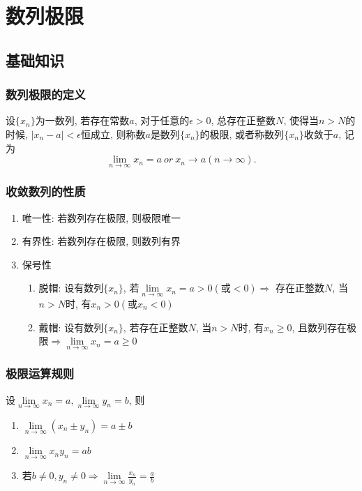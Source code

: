 \chapter{数列极限}
\section{基础知识}
\subsection{数列极限的定义}
设$ \{x_{n}\} $为一数列, 若存在常数$ a $, 对于任意的$ \epsilon >0 $, 总存在正整数$ N $, 使得当$ n>N $的时候, $ |x_{n}-a|<\epsilon $恒成立, 则称数$ a $是数列$ \{x_{n}\} $的极限, 或者称数列$ \{x_{n}\} $收敛于$ a $, 记为
\begin{equation*}
\lim_{n\rightarrow \infty} x_{n} = a\ or\ x_{n}\rightarrow a(n\rightarrow \infty).
\end{equation*}
\subsection{收敛数列的性质}
\begin{enumerate}
\item 唯一性: 若数列存在极限, 则极限唯一
\item 有界性: 若数列存在极限, 则数列有界
\item 保号性
\begin{enumerate}
\item 脱帽: 设有数列$ \{x_{n}\} $, 若$ \lim\limits_{n\rightarrow \infty}x_{n}=a>0(\text{或}<0)\Rightarrow $ 存在正整数$ N $, 当$ n>N $时, 有$ x_{n}>0(\text{或}x_{n}<0) $
\item 戴帽: 设有数列$ \{x_{n}\} $, 若存在正整数$ N $, 当$ n>N $时, 有$ x_{n}\ge 0 $, 且数列存在极限$ \Rightarrow \lim\limits_{n\rightarrow \infty}x_{n}=a\ge 0 $
\end{enumerate}
\end{enumerate}
\subsection{极限运算规则}
设$ \lim\limits_{n\rightarrow \infty}x_{n}=a, \lim\limits_{n\rightarrow \infty}y_{n}=b $, 则
\begin{enumerate}
\item $ \lim\limits_{n\rightarrow \infty}(x_{n}\pm y_{n})=a\pm b $
\item $ \lim\limits_{n\rightarrow \infty}x_{n}y_{n}=ab $
\item 若$ b\neq 0, y_{n}\neq 0 \Rightarrow \lim\limits_{n\rightarrow \infty}\frac{x_{n}}{y_{n}}=\frac{a}{b}$
\end{enumerate}
